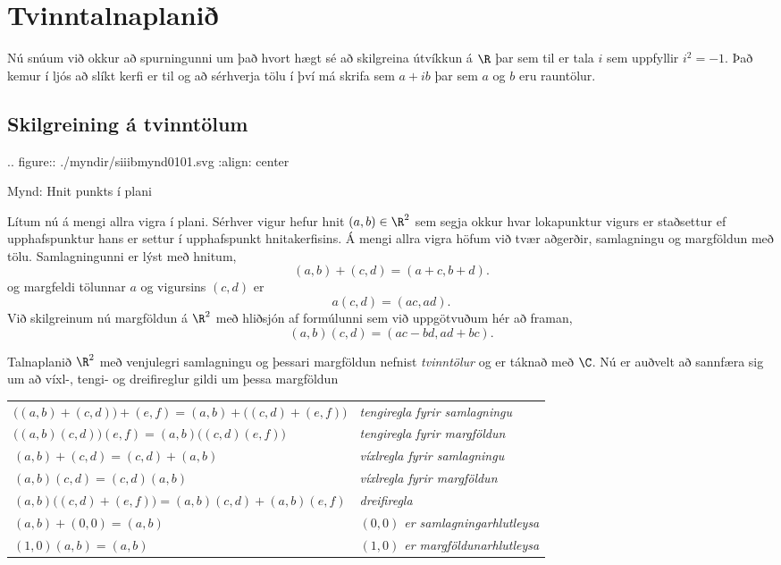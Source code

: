 \section{Tvinntalnaplanið}

Nú snúum við okkur að spurningunni um það  hvort hægt sé að skilgreina
útvíkkun  á $\R$ þar sem til er tala $i$ sem uppfyllir $i^2=-1$.
Það kemur í ljós að slíkt kerfi er til og að sérhverja tölu í því má
skrifa sem $a+ib$ þar sem $a$ og $b$ eru rauntölur.


\subsection*{Skilgreining á tvinntölum}


.. figure:: ./myndir/siiibmynd0101.svg
    :align: center

    Mynd: Hnit punkts í plani

  
Lítum nú á mengi allra vigra í plani.  Sérhver vigur hefur hnit
$(a,b)\in \R^2$ sem segja okkur hvar lokapunktur vigurs er staðsettur ef
upphafspunktur hans er settur í upphafspunkt hnitakerfisins.
Á mengi allra vigra höfum við tvær aðgerðir, samlagningu og margföldun
með tölu.  Samlagningunni er lýst með hnitum, 
$$(a,b)+(c,d)=(a+c,b+d).
$$  
og margfeldi tölunnar $a$ og vigursins $(c,d)$ er
$$
a(c,d)=(ac,ad).
$$ 
Við skilgreinum nú margföldun á $\R^2$ með hliðsjón af formúlunni sem við
uppgötvuðum hér að framan, 
$$
(a,b)(c,d)=(ac-bd,ad+bc).
$$


Talnaplanið $\R^2$ með venjulegri samlagningu og þessari margföldun
nefnist {\it tvinntölur } og er táknað með $\C$.  Nú er auðvelt að
sannfæra  sig um að víxl-, tengi- og dreifireglur gildi um
þessa margföldun
\begin{center}
\begin{tabular}{ll}
$\big((a,b)+(c,d)\big)+(e,f)=(a,b)+\big((c,d)+(e,f)\big)$
&{\it tengiregla fyrir samlagningu}\\
$\big((a,b)(c,d)\big)(e,f)=(a,b)\big((c,d)(e,f)\big)$
&{\it tengiregla fyrir margföldun}\\
$(a,b)+(c,d)=(c,d)+(a,b)$ 
&{\it víxlregla fyrir samlagningu} \\
$(a,b)(c,d)=(c,d)(a,b)$ 
&{\it víxlregla fyrir margföldun} \\
$(a,b)\big((c,d)+(e,f)\big) =(a,b)(c,d)+(a,b)(e,f)$
&{\it dreifiregla}\\
$(a,b)+(0,0)=(a,b)$
&{\it $(0,0)$ er samlagningarhlutleysa}\\
$(1,0)(a,b)=(a,b)$
&{\it $(1,0)$ er margföldunarhlutleysa}\\
\end{tabular}
\end{center}


